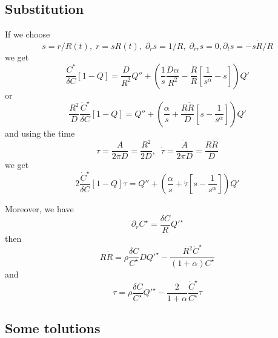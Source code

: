 \documentclass[11pt]{revtex4}
\begin{document}
\subsection{Substitution}
If we choose
\begin{equation}
	s = r/R(t),\; r = s R(t),\; \partial_r s = 1/R,\;\partial_{rr} s = 0, \partial_t s = - s \dot{R}/R
\end{equation}
we get
\begin{equation}
\dfrac{\dot{C}^\star}{\delta C} \left[1-Q\right] = \dfrac{D}{R^2} Q'' + 
\left( \dfrac{1}{s} \dfrac{D \alpha}{R^2} - \dfrac{\dot{R}}{R}\left[ \dfrac{1}{s^\alpha} - s \right]\right) Q'
\end{equation}
or
\begin{equation} 
\dfrac{R^2}{D}\dfrac{\dot{C}^\star}{\delta C} \left[1-Q\right] = Q'' + \left( \dfrac{\alpha}{s} + \dfrac{R\dot{R}}{D} \left[s-\dfrac{1}{s^\alpha}\right]\right) Q'
\end{equation}
and using the time
\begin{equation}
	\tau = \dfrac{A}{2\pi D} = \dfrac{R^2}{2D}, \;\; \dot{\tau} = \dfrac{\dot{A}}{2\pi D} = \dfrac{R\dot{R}}{D}
\end{equation}
we get
\begin{equation}
	2\dfrac{\dot{C}^\star}{\delta C} \left[1-Q\right] \tau = Q'' + \left( \dfrac{\alpha}{s} + \dot{\tau} \left[s-\dfrac{1}{s^\alpha}\right]\right) Q'
\end{equation}

Moreover, we have
\begin{equation}
	\partial_r C^\star = \dfrac{\delta C}{R} Q'^\star
\end{equation}
then
\begin{equation}
	R \dot{R} = \rho \dfrac{\delta C}{C^\star} D Q'^\star - \dfrac{R^2\dot{C}^\star}{\left(1+\alpha\right)C^\star}
\end{equation}
and
\begin{equation}
\dot{\tau} = \rho \dfrac{\delta C}{C^\star} Q'^\star - \dfrac{2}{1+\alpha} \dfrac{\dot{C}^\star}{C^\star} \tau
\end{equation}

\subsection{Some tolutions}
\end{document}
